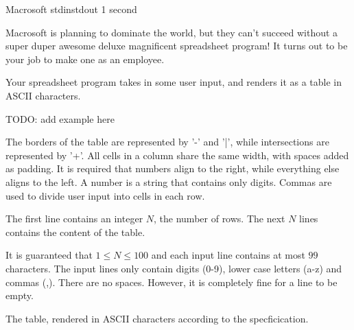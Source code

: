 \begin{problem}{Macrosoft}
{stdin}{stdout}
{1 second}{}{}

Macrosoft is planning to dominate the world, but they can't succeed without 
a super duper awesome deluxe magnificent spreadsheet program! It turns out to be your job to
make one as an employee. 

Your spreadsheet program takes in some user input, and renders it as a table in ASCII characters. 
\begin{center}
TODO: add example here
\end{center}
The borders of the table are represented by '-' and '|', while intersections are represented by '+'. All cells in a column share the same width, with spaces added as padding. It is required that numbers align to the right, while everything else aligns to the left. A number is a string that contains only digits. Commas are used to divide user input into cells in each row. 

\InputFile

The first line contains an integer $N$, the number of rows.
The next $N$ lines contains the content of the table. 

It is guaranteed that $1 \leq N \leq 100$ and each input line contains at most $99$ characters. 
The input lines only contain digits (0-9), lower case letters (a-z) and commas (,). There are no spaces. However, it is completely fine for a line to be empty.

\OutputFile

The table, rendered in ASCII characters according to the specficication.

\Examples

\begin{example}
%
%
%

\end{example}
\end{problem}
